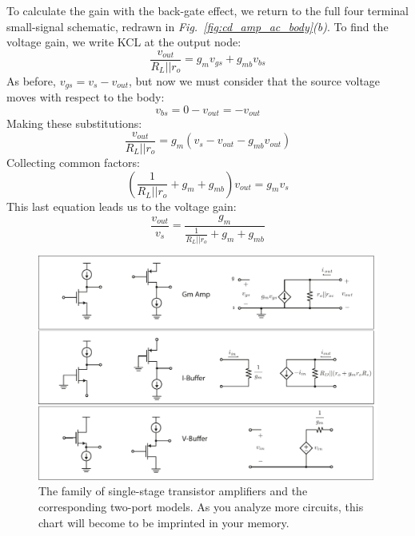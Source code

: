 To calculate the gain with the back-gate effect, we return to the full four terminal small-signal schematic, redrawn in \emph{Fig.~\ref{fig:cd_amp_ac_body}(b)}.  To find the voltage gain, we write KCL at the output node: 
    \begin{equation}
        \frac{{{v_{out}}}}{{{R_L}||{r_o}}} = {g_m}{v_{gs}} + g_{mb} v_{bs} 
    \end{equation}
As before, $v_{gs} = v_{s} - v_{out}$, but now we must consider that the source voltage moves with respect to the body:
    \begin{equation}
        v_{bs} = 0 - v_{out} = -v_{out}
    \end{equation}
Making these substitutions:
    \begin{equation}
        \frac{{{v_{out}}}}{{{R_L}||{r_o}}} = {g_m}\left( {{v_{s}} - {v_{out}}}  - g_{mb} v_{out} \right)
    \end{equation}
Collecting common factors:
    \begin{equation}
        \left( {\frac{1}{{{R_L}||{r_o}}} + {g_m} + g_{mb} } \right){v_{out}} = {g_m}{v_{s}}
    \end{equation}
This last equation leads us to the voltage gain:
    \begin{equation}
        \frac{{{v_{out}}}}{{{v_{s}}}} = \frac{{{g_m}}}{{\frac{1}{{{R_L}||{r_o}}} + {g_m} + g_{mb}}}
    \end{equation}
\newpage
\begin{figure}[t]
\centering
\includegraphics[width=\columnwidth]{ampchart_models}
\caption{The family of single-stage transistor amplifiers and the corresponding two-port models.  As you analyze more circuits, this chart will become to be imprinted in your memory.}
\label{fig:ampchart_models}
\end{figure}
